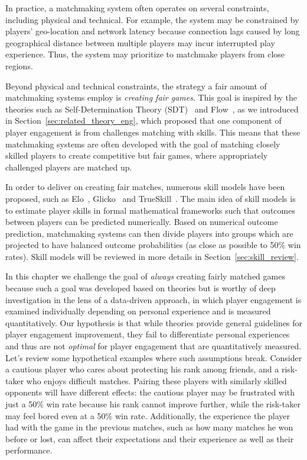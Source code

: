 In practice, a matchmaking system often operates on several constraints, including physical and technical. For example, the system may be constrained by players' geo-location and network latency because connection lags caused by long geographical distance between multiple players may incur interrupted play experience. Thus, the system may prioritize to matchmake players from close regions.

Beyond physical and technical constraints, the strategy a fair amount of matchmaking systems employ is \emph{creating fair games}. This goal is inspired by the theories such as Self-Determination Theory (SDT)~\citep{ryan2000self} and Flow~\citep{flow1990psychology}, as we introduced in Section~\ref{sec:related_theory_eng}, which proposed that one component of player engagement is from challenges matching with skills. This means that these matchmaking systems are often developed with the goal of matching closely skilled players to create competitive but fair games, where appropriately challenged players are matched up. 

In order to deliver on creating fair matches, numerous skill models have been proposed, such as Elo~\citep{elo1978rating}, Glicko~\citep{glickman1999parameter} and TrueSkill~\citep{herbrich:trueskill}. The main idea of skill models is to estimate player skills in formal mathematical frameworks such that outcomes between players can be predicted numerically. Based on numerical outcome prediction, matchmaking systems can then divide players into groups which are projected to have balanced outcome probabilities (as close as possible to 50\% win rates). Skill models will be reviewed in more details in Section~\ref{sec:skill_review}.

In this chapter we challenge the goal of \textit{always} creating fairly matched games because such a goal was developed based on theories  but is worthy of deep investigation in the lens of a data-driven approach, in which player engagement is examined individually depending on personal experience and is measured quantitatively. Our hypothesis is that while theories provide general guidelines for player engagement improvement, they fail to differentiate personal experiences and thus are not \textit{optimal} for player engagement that are quantitatively measured. Let's review some hypothetical examples where such assumptions break. Consider a cautious player who cares about protecting his rank among friends, and a risk-taker who enjoys difficult matches. Pairing these players with similarly skilled opponents will have different effects: the cautious player may be frustrated with just a 50\% win rate because his rank cannot improve further, while the risk-taker may feel bored even at a 50\% win rate. Additionally, the experience the player had with the game in the previous matches, such as how many matches he won before or lost, can affect their expectations and their experience as well as their performance. 

